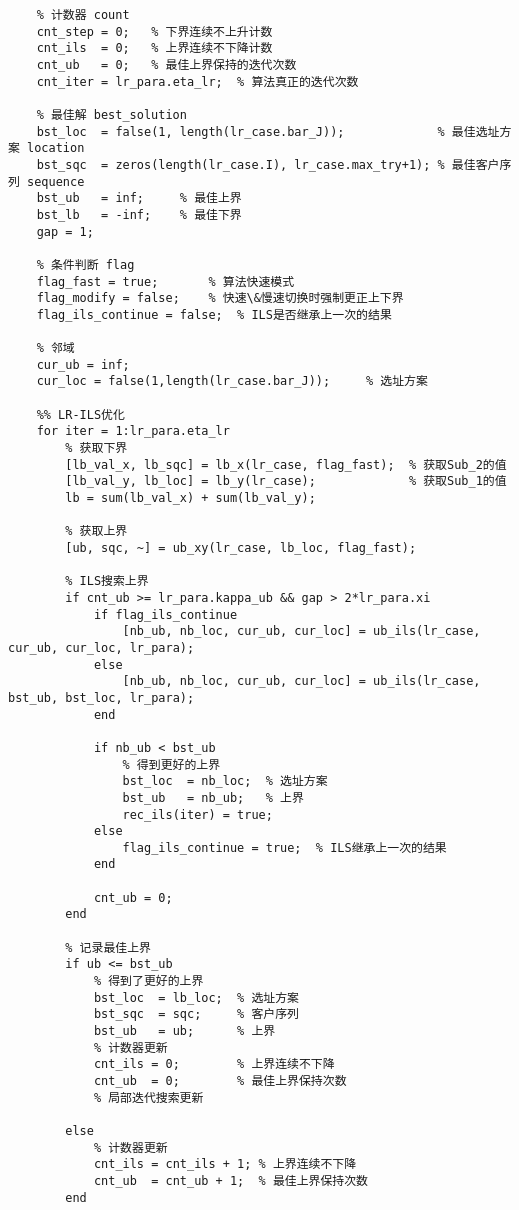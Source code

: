 {\begin{lstlisting}
    % 计数器 count
    cnt_step = 0;   % 下界连续不上升计数
    cnt_ils  = 0;   % 上界连续不下降计数
    cnt_ub   = 0;   % 最佳上界保持的迭代次数
    cnt_iter = lr_para.eta_lr;  % 算法真正的迭代次数

    % 最佳解 best_solution
    bst_loc  = false(1, length(lr_case.bar_J));             % 最佳选址方案 location
    bst_sqc  = zeros(length(lr_case.I), lr_case.max_try+1); % 最佳客户序列 sequence
    bst_ub   = inf;     % 最佳上界
    bst_lb   = -inf;    % 最佳下界
    gap = 1;

    % 条件判断 flag
    flag_fast = true;       % 算法快速模式
    flag_modify = false;    % 快速\&慢速切换时强制更正上下界
    flag_ils_continue = false;  % ILS是否继承上一次的结果

    % 邻域
    cur_ub = inf;
    cur_loc = false(1,length(lr_case.bar_J));     % 选址方案

    %% LR-ILS优化
    for iter = 1:lr_para.eta_lr
        % 获取下界
        [lb_val_x, lb_sqc] = lb_x(lr_case, flag_fast);  % 获取Sub_2的值
        [lb_val_y, lb_loc] = lb_y(lr_case);             % 获取Sub_1的值
        lb = sum(lb_val_x) + sum(lb_val_y);

        % 获取上界
        [ub, sqc, ~] = ub_xy(lr_case, lb_loc, flag_fast);

        % ILS搜索上界
        if cnt_ub >= lr_para.kappa_ub && gap > 2*lr_para.xi
            if flag_ils_continue
                [nb_ub, nb_loc, cur_ub, cur_loc] = ub_ils(lr_case, cur_ub, cur_loc, lr_para);
            else
                [nb_ub, nb_loc, cur_ub, cur_loc] = ub_ils(lr_case, bst_ub, bst_loc, lr_para);
            end

            if nb_ub < bst_ub
                % 得到更好的上界
                bst_loc  = nb_loc;  % 选址方案
                bst_ub   = nb_ub;   % 上界 
                rec_ils(iter) = true;
            else
                flag_ils_continue = true;  % ILS继承上一次的结果
            end

            cnt_ub = 0;
        end

        % 记录最佳上界
        if ub <= bst_ub
            % 得到了更好的上界
            bst_loc  = lb_loc;  % 选址方案
            bst_sqc  = sqc;     % 客户序列
            bst_ub   = ub;      % 上界
            % 计数器更新
            cnt_ils = 0;        % 上界连续不下降
            cnt_ub  = 0;        % 最佳上界保持次数
            % 局部迭代搜索更新

        else
            % 计数器更新
            cnt_ils = cnt_ils + 1; % 上界连续不下降
            cnt_ub  = cnt_ub + 1;  % 最佳上界保持次数
        end


\end{lstlisting}}
